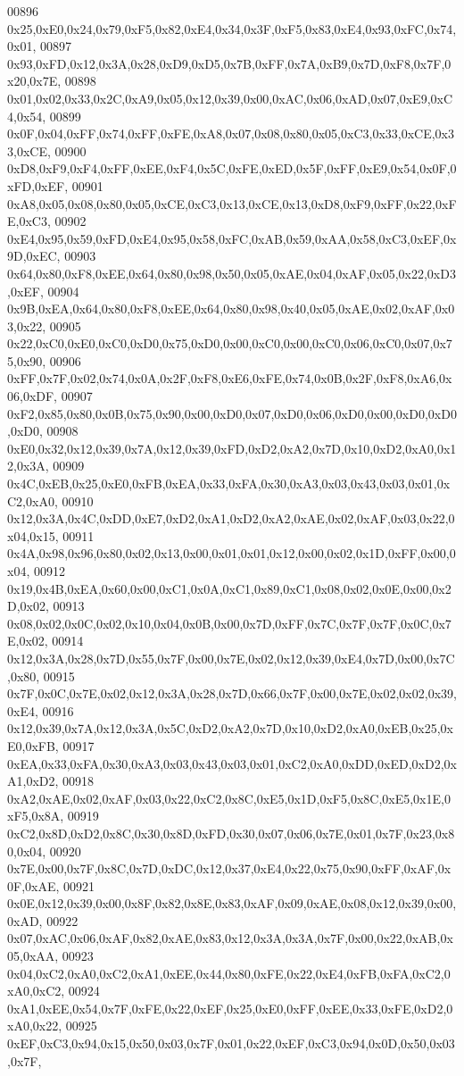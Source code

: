 \begin{DoxyCode}
00896 0x25,0xE0,0x24,0x79,0xF5,0x82,0xE4,0x34,0x3F,0xF5,0x83,0xE4,0x93,0xFC,0x74,0x01,
00897 0x93,0xFD,0x12,0x3A,0x28,0xD9,0xD5,0x7B,0xFF,0x7A,0xB9,0x7D,0xF8,0x7F,0x20,0x7E,
00898 0x01,0x02,0x33,0x2C,0xA9,0x05,0x12,0x39,0x00,0xAC,0x06,0xAD,0x07,0xE9,0xC4,0x54,
00899 0x0F,0x04,0xFF,0x74,0xFF,0xFE,0xA8,0x07,0x08,0x80,0x05,0xC3,0x33,0xCE,0x33,0xCE,
00900 0xD8,0xF9,0xF4,0xFF,0xEE,0xF4,0x5C,0xFE,0xED,0x5F,0xFF,0xE9,0x54,0x0F,0xFD,0xEF,
00901 0xA8,0x05,0x08,0x80,0x05,0xCE,0xC3,0x13,0xCE,0x13,0xD8,0xF9,0xFF,0x22,0xFE,0xC3,
00902 0xE4,0x95,0x59,0xFD,0xE4,0x95,0x58,0xFC,0xAB,0x59,0xAA,0x58,0xC3,0xEF,0x9D,0xEC,
00903 0x64,0x80,0xF8,0xEE,0x64,0x80,0x98,0x50,0x05,0xAE,0x04,0xAF,0x05,0x22,0xD3,0xEF,
00904 0x9B,0xEA,0x64,0x80,0xF8,0xEE,0x64,0x80,0x98,0x40,0x05,0xAE,0x02,0xAF,0x03,0x22,
00905 0x22,0xC0,0xE0,0xC0,0xD0,0x75,0xD0,0x00,0xC0,0x00,0xC0,0x06,0xC0,0x07,0x75,0x90,
00906 0xFF,0x7F,0x02,0x74,0x0A,0x2F,0xF8,0xE6,0xFE,0x74,0x0B,0x2F,0xF8,0xA6,0x06,0xDF,
00907 0xF2,0x85,0x80,0x0B,0x75,0x90,0x00,0xD0,0x07,0xD0,0x06,0xD0,0x00,0xD0,0xD0,0xD0,
00908 0xE0,0x32,0x12,0x39,0x7A,0x12,0x39,0xFD,0xD2,0xA2,0x7D,0x10,0xD2,0xA0,0x12,0x3A,
00909 0x4C,0xEB,0x25,0xE0,0xFB,0xEA,0x33,0xFA,0x30,0xA3,0x03,0x43,0x03,0x01,0xC2,0xA0,
00910 0x12,0x3A,0x4C,0xDD,0xE7,0xD2,0xA1,0xD2,0xA2,0xAE,0x02,0xAF,0x03,0x22,0x04,0x15,
00911 0x4A,0x98,0x96,0x80,0x02,0x13,0x00,0x01,0x01,0x12,0x00,0x02,0x1D,0xFF,0x00,0x04,
00912 0x19,0x4B,0xEA,0x60,0x00,0xC1,0x0A,0xC1,0x89,0xC1,0x08,0x02,0x0E,0x00,0x2D,0x02,
00913 0x08,0x02,0x0C,0x02,0x10,0x04,0x0B,0x00,0x7D,0xFF,0x7C,0x7F,0x7F,0x0C,0x7E,0x02,
00914 0x12,0x3A,0x28,0x7D,0x55,0x7F,0x00,0x7E,0x02,0x12,0x39,0xE4,0x7D,0x00,0x7C,0x80,
00915 0x7F,0x0C,0x7E,0x02,0x12,0x3A,0x28,0x7D,0x66,0x7F,0x00,0x7E,0x02,0x02,0x39,0xE4,
00916 0x12,0x39,0x7A,0x12,0x3A,0x5C,0xD2,0xA2,0x7D,0x10,0xD2,0xA0,0xEB,0x25,0xE0,0xFB,
00917 0xEA,0x33,0xFA,0x30,0xA3,0x03,0x43,0x03,0x01,0xC2,0xA0,0xDD,0xED,0xD2,0xA1,0xD2,
00918 0xA2,0xAE,0x02,0xAF,0x03,0x22,0xC2,0x8C,0xE5,0x1D,0xF5,0x8C,0xE5,0x1E,0xF5,0x8A,
00919 0xC2,0x8D,0xD2,0x8C,0x30,0x8D,0xFD,0x30,0x07,0x06,0x7E,0x01,0x7F,0x23,0x80,0x04,
00920 0x7E,0x00,0x7F,0x8C,0x7D,0xDC,0x12,0x37,0xE4,0x22,0x75,0x90,0xFF,0xAF,0x0F,0xAE,
00921 0x0E,0x12,0x39,0x00,0x8F,0x82,0x8E,0x83,0xAF,0x09,0xAE,0x08,0x12,0x39,0x00,0xAD,
00922 0x07,0xAC,0x06,0xAF,0x82,0xAE,0x83,0x12,0x3A,0x3A,0x7F,0x00,0x22,0xAB,0x05,0xAA,
00923 0x04,0xC2,0xA0,0xC2,0xA1,0xEE,0x44,0x80,0xFE,0x22,0xE4,0xFB,0xFA,0xC2,0xA0,0xC2,
00924 0xA1,0xEE,0x54,0x7F,0xFE,0x22,0xEF,0x25,0xE0,0xFF,0xEE,0x33,0xFE,0xD2,0xA0,0x22,
00925 0xEF,0xC3,0x94,0x15,0x50,0x03,0x7F,0x01,0x22,0xEF,0xC3,0x94,0x0D,0x50,0x03,0x7F,

\end{DoxyCode}
